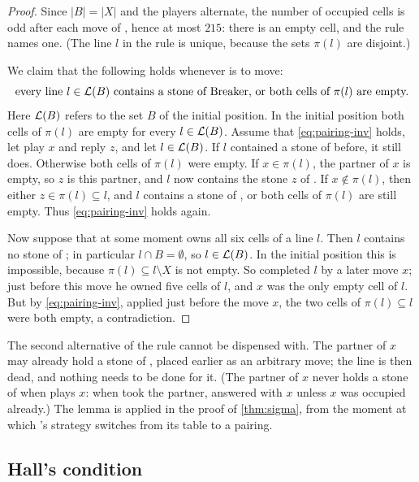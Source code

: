\begin{proof}
Since $|B|=|X|$ and the players alternate, the number of occupied cells is odd after each move of \Maker,
hence at most $215$: there is an empty cell, and the rule names one. (The line $l$ in the rule is unique,
because the sets $\pi(l)$ are disjoint.)

We claim that the following holds whenever \Maker{} is to move:
\begin{equation}\label{eq:pairing-inv}
  \text{every line $l\in\mathcal{L}(B)$ contains a stone of Breaker, or both cells of $\pi(l)$ are empty.}
\end{equation}
Here $\mathcal{L}(B)$ refers to the set $B$ of the initial position. In the initial position both cells of
$\pi(l)$ are empty for every $l\in\mathcal{L}(B)$. Assume that \eqref{eq:pairing-inv} holds, let \Maker{} play
$x$ and \Breaker{} reply $z$, and let $l\in\mathcal{L}(B)$. If $l$ contained a stone of \Breaker{} before, it
still does. Otherwise both cells of $\pi(l)$ were empty. If $x\in\pi(l)$, the partner of $x$ is empty, so
$z$ is this partner, and $l$ now contains the stone $z$ of \Breaker. If $x\notin\pi(l)$, then either
$z\in\pi(l)\subseteq l$, and $l$ contains a stone of \Breaker, or both cells of $\pi(l)$ are still empty.
Thus \eqref{eq:pairing-inv} holds again.

Now suppose that at some moment \Maker{} owns all six cells of a line $l$. Then $l$ contains no stone of
\Breaker; in particular $l\cap B=\emptyset$, so $l\in\mathcal{L}(B)$. In the initial position this is
impossible, because $\pi(l)\subseteq l\setminus X$ is not empty. So \Maker{} completed $l$ by a later move
$x$; just before this move he owned five cells of $l$, and $x$ was the only empty cell of $l$. But by
\eqref{eq:pairing-inv}, applied just before the move $x$, the two cells of $\pi(l)\subseteq l$ were both
empty, a contradiction.
\end{proof}

The second alternative of the rule cannot be dispensed with. The partner of $x$ may already hold a stone
of \Breaker, placed earlier as an arbitrary move; the line is then dead, and nothing needs to be done for
it. (The partner of $x$ never holds a stone of \Maker{} when \Maker{} plays $x$: when \Maker{} took the
partner, \Breaker{} answered with $x$ unless $x$ was occupied already.) The
lemma is applied in the proof of \cref{thm:sigma}, from the moment at which \Breaker's strategy switches
from its table to a pairing.

\subsection{Hall's condition}\label{ssec:hall}

